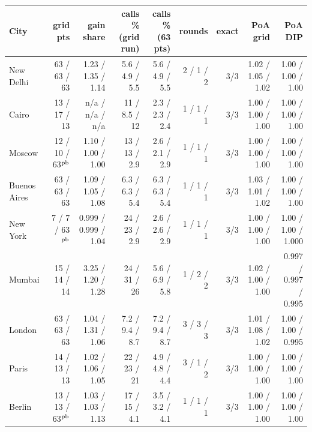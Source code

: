 \begin{tabular}{lrrrrrrrr}
\toprule
City & grid pts & gain share & calls \% (grid run) & calls \% (63 pts) & rounds & exact & PoA grid & PoA DIP \\
\midrule
New Delhi & 63 / 63 / 63 & 1.23 / 1.35 / 1.14 & 5.6 / 4.9 / 5.5 & 5.6 / 4.9 / 5.5 & 2 / 1 / 2 & 3/3 & 1.02 / 1.05 / 1.02 & 1.00 / 1.00 / 1.00 \\
Cairo & 13 / 17 / 13 & n/a / n/a / n/a & 11 / 8.5 / 12 & 2.3 / 2.3 / 2.4 & 1 / 1 / 1 & 3/3 & 1.00 / 1.00 / 1.00 & 1.00 / 1.00 / 1.00 \\
Moscow & 12 / 10 / 63$^{\rm pb}$ & 1.10 / 1.00 / 1.00 & 13 / 13 / 2.9 & 2.6 / 2.1 / 2.9 & 1 / 1 / 1 & 3/3 & 1.00 / 1.00 / 1.00 & 1.00 / 1.00 / 1.00 \\
Buenos Aires & 63 / 63 / 63 & 1.09 / 1.05 / 1.08 & 6.3 / 6.3 / 5.4 & 6.3 / 6.3 / 5.4 & 1 / 1 / 1 & 3/3 & 1.03 / 1.01 / 1.02 & 1.00 / 1.00 / 1.00 \\
New York & 7 / 7 / 63$^{\rm pb}$ & 0.999 / 0.999 / 1.04 & 24 / 23 / 2.9 & 2.6 / 2.6 / 2.9 & 1 / 1 / 1 & 3/3 & 1.00 / 1.00 / 1.00 & 1.00 / 1.00 / 1.000 \\
Mumbai & 15 / 14 / 14 & 3.25 / 1.20 / 1.28 & 24 / 31 / 26 & 5.6 / 6.9 / 5.8 & 1 / 2 / 2 & 3/3 & 1.02 / 1.00 / 1.00 & 0.997 / 0.997 / 0.995 \\
London & 63 / 63 / 63 & 1.04 / 1.31 / 1.06 & 7.2 / 9.4 / 8.7 & 7.2 / 9.4 / 8.7 & 3 / 3 / 3 & 3/3 & 1.01 / 1.08 / 1.02 & 1.00 / 1.00 / 0.995 \\
Paris & 14 / 13 / 13 & 1.02 / 1.06 / 1.05 & 22 / 23 / 21 & 4.9 / 4.8 / 4.4 & 3 / 1 / 2 & 3/3 & 1.00 / 1.00 / 1.00 & 1.00 / 1.00 / 1.00 \\
Berlin & 13 / 13 / 63$^{\rm pb}$ & 1.03 / 1.03 / 1.13 & 17 / 15 / 4.1 & 3.5 / 3.2 / 4.1 & 1 / 1 / 1 & 3/3 & 1.00 / 1.00 / 1.00 & 1.00 / 1.00 / 1.00 \\
\bottomrule
\end{tabular}
